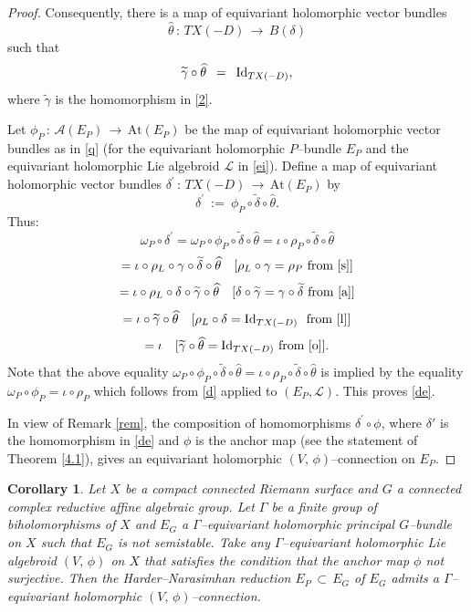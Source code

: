 \documentclass[12pt, reqno]{amsart}
\numberwithin{equation}{section}
\newtheorem{corollary}[theorem]{Corollary}
\newcommand{\At}{\textrm{At}}
\newcommand{\from}{\textrm{from}}
\begin{document}
\begin{proof}
Consequently, there is a map of equivariant holomorphic 
vector bundles $$\widehat{\theta}\,:\, TX(-D)\, \longrightarrow\, B(\delta)$$ such that 
\begin{equation}\label{o}
\widetilde{\gamma}\circ\widehat{\theta}\,\ =\,\ {\rm Id}_{TX(-D)},
\end{equation}
where $\widetilde{\gamma}$ is the homomorphism in \eqref{2}.

Let $\phi_{P}\,:\,\mathcal{A}(E_{P})\,\longrightarrow\, \At(E_{P})$ be the map of equivariant holomorphic
vector bundles as in \eqref{q} (for the equivariant holomorphic $P$--bundle $E_{P}$ and the
equivariant holomorphic Lie algebroid $\mathcal{L}$ in \eqref{ei}). Define a map of equivariant holomorphic
vector bundles $\delta^{'}\,:\, TX(-D)\, \longrightarrow\, \At(E_{P})$ by 
\[\delta^{'}\ :=\ \phi_{P}\circ\widetilde{\delta}\circ\widehat{\theta}.\] Thus:
\[\omega_{P}\circ\delta^{'}
=\omega_{P}\circ\phi_{P}\circ\widetilde{\delta}\circ\widehat{\theta}
=\iota\circ\rho_{P}\circ\widetilde{\delta}\circ\widehat{\theta}\]
\[=\iota\circ\rho_{L}\circ\gamma\circ\widetilde{\delta}\circ\widehat{\theta}~\,\,\,\,[\rho_{L}\circ\gamma=\rho_{P}~
\from~\eqref{s}]\]
\[=\iota\circ\rho_{L}\circ\delta\circ\widetilde{\gamma}\circ\widehat{\theta}~\,\,\,\,
[\delta\circ\widetilde{\gamma}=\gamma\circ\widetilde{\delta}~\from~\eqref{a}]\]
\[=\iota\circ\widetilde{\gamma}\circ\widehat{\theta}~\,\,\,\,[\rho_{L}\circ\delta=
{\rm Id}_{TX(-D)}~\,\, \from~\eqref{l}]\]
\[=\iota~\,\,\,\,[\widetilde{\gamma}\circ\widehat{\theta}={\rm Id}_{TX(-D)}~\from~\eqref{o}].\]
Note that the above equality $\omega_{P}\circ\phi_{P}\circ\widetilde{\delta}\circ\widehat{\theta}
=\iota\circ\rho_{P}\circ\widetilde{\delta}\circ\widehat{\theta}$ is implied by the equality
$\omega_{P}\circ\phi_{P}=\iota\circ\rho_{P}$ which follows from \eqref{d} applied to $(E_{P},\mathcal{L})$.
This proves \eqref{de}.

In view of Remark \ref{rem}, the composition of homomorphisms $\delta^{'}\circ\phi$, where $\delta'$ is the
homomorphism in \eqref{de} and $\phi$ is the anchor map (see the statement of Theorem \ref{4.1}), gives
an equivariant holomorphic $(V,\,\phi)$--connection on $E_P$.
\end{proof}

\begin{corollary}\label{imp}
Let $X$ be a compact connected Riemann surface and $G$ a connected complex reductive affine algebraic group.
Let $\Gamma$ be a finite group of biholomorphisms of $X$ and $E_{G}$ a $\Gamma$--equivariant holomorphic 
principal $G$--bundle on $X$ such that $E_G$ is not semistable. Take any $\Gamma$--equivariant holomorphic Lie 
algebroid $(V,\, \phi)$ on $X$ that satisfies the condition that the anchor map
$\phi$ not surjective. Then the Harder--Narasimhan reduction $E_{P}\,\subset\, 
E_{G}$ of $E_G$ admits a $\Gamma$--equivariant holomorphic $(V,\, \phi)$--connection.
\end{corollary} 
\end{document}
